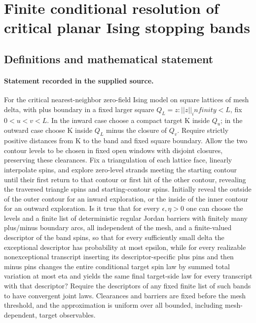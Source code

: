 \documentclass[11pt]{article}
\begin{document}
\section*{Finite conditional resolution of critical planar Ising stopping bands}\label{30007420}
\subsection{Definitions and mathematical statement}
\paragraph{Statement recorded in the supplied source.}
For the critical nearest-neighbor zero-field Ising model on square lattices of mesh delta, with plus boundary in a fixed larger square $Q_L={z:||z||_infinity<L}$, fix $0<u<v<L$. In the inward case choose a compact target K inside $Q_u$; in the outward case choose K inside $Q_L$ minus the closure of $Q_v$. Require strictly positive distances from K to the band and fixed square boundary. Allow the two contour levels to be chosen in fixed open windows with disjoint closures, preserving these clearances. Fix a triangulation of each lattice face, linearly interpolate spins, and explore zero-level strands meeting the starting contour until their first return to that contour or first hit of the other contour, revealing the traversed triangle spins and starting-contour spins. Initially reveal the outside of the outer contour for an inward exploration, or the inside of the inner contour for an outward exploration. Is it true that for every $\epsilon ,\eta >0$ one can choose the levels and a finite list of deterministic regular Jordan barriers with finitely many plus/minus boundary arcs, all independent of the mesh, and a finite-valued descriptor of the band spins, so that for every sufficiently small delta the exceptional descriptor has probability at most epsilon, while for every realizable nonexceptional transcript inserting its descriptor-specific plus pins and then minus pins changes the entire conditional target spin law by summed total variation at most eta and yields the same final target-side law for every transcript with that descriptor? Require the descriptors of any fixed finite list of such bands to have convergent joint laws. Clearances and barriers are fixed before the mesh threshold, and the approximation is uniform over all bounded, including mesh-dependent, target observables.
\end{document}
